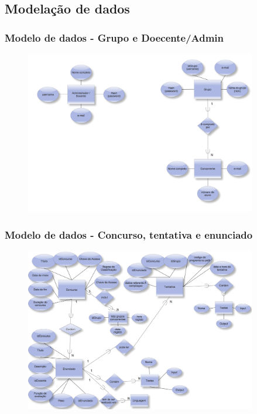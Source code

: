 \documentclass{beamer}
\begin{document}
\subsection{Modelação de dados}
\begin{frame} \frametitle{Modelo de dados - Grupo e Doecente/Admin}
\begin{figure}[htbp]
\begin{center}
\includegraphics[width=0.9\textwidth]{../report1/Images/grupo-docente}
\end{center}
\end{figure}
\end{frame}

\begin{frame} \frametitle{Modelo de dados - Concurso, tentativa e enunciado}
\begin{figure}[htbp]
\begin{center}
\includegraphics[width=0.9\textwidth]{../report1/Images/concurso-enunciado}
\end{center}
\end{figure}
\end{frame}
\end{document}
